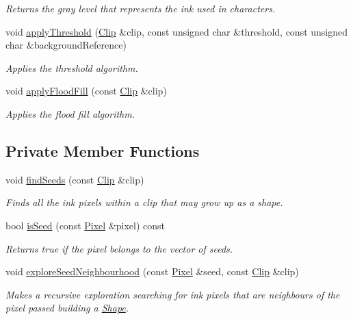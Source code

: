 \begin{CompactItemize}
\begin{CompactList}\small\item\em Returns the gray level that represents the ink used in characters. \item\end{CompactList}\item 
void \hyperlink{class_segmenter_6854315e3320f9d9a8ece14cbb8570ee}{applyThreshold} (\hyperlink{class_clip}{Clip} \&clip, const unsigned char \&threshold, const unsigned char \&backgroundReference)
\begin{CompactList}\small\item\em Applies the threshold algorithm. \item\end{CompactList}\item 
void \hyperlink{class_segmenter_327c88f2d55cb606a67ce778c06cf426}{applyFloodFill} (const \hyperlink{class_clip}{Clip} \&clip)
\begin{CompactList}\small\item\em Applies the flood fill algorithm. \item\end{CompactList}\end{CompactItemize}
\subsection*{Private Member Functions}
\begin{CompactItemize}
\item 
void \hyperlink{class_segmenter_bacab187b543a51c5322c01fc0a29ffb}{findSeeds} (const \hyperlink{class_clip}{Clip} \&clip)
\begin{CompactList}\small\item\em Finds all the ink pixels within a clip that may grow up as a shape. \item\end{CompactList}\item 
bool \hyperlink{class_segmenter_eb86d455481f794cb4870eba98ee4340}{isSeed} (const \hyperlink{_pixel_8hpp_535e59456e3e633842529cfa8ea103c4}{Pixel} \&pixel) const 
\begin{CompactList}\small\item\em Returns true if the pixel belongs to the vector of seeds. \item\end{CompactList}\item 
void \hyperlink{class_segmenter_684df74b0e810a837669823c47b6ed87}{exploreSeedNeighbourhood} (const \hyperlink{_pixel_8hpp_535e59456e3e633842529cfa8ea103c4}{Pixel} \&seed, const \hyperlink{class_clip}{Clip} \&clip)
\begin{CompactList}\small\item\em Makes a recursive exploration searching for ink pixels that are neighbours of the pixel passed building a \hyperlink{class_shape}{Shape}. \item\end{CompactList}\end{CompactItemize}
